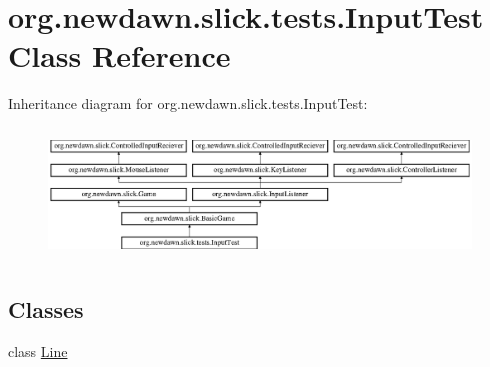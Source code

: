 \hypertarget{classorg_1_1newdawn_1_1slick_1_1tests_1_1_input_test}{}\section{org.\+newdawn.\+slick.\+tests.\+Input\+Test Class Reference}
\label{classorg_1_1newdawn_1_1slick_1_1tests_1_1_input_test}
Inheritance diagram for org.\+newdawn.\+slick.\+tests.\+Input\+Test\+:\begin{figure}[H]
\begin{center}
\leavevmode
\includegraphics[height=3.522012cm]{classorg_1_1newdawn_1_1slick_1_1tests_1_1_input_test}
\end{center}
\end{figure}
\subsection*{Classes}
\begin{DoxyCompactItemize}
\item 
class \mbox{\hyperlink{classorg_1_1newdawn_1_1slick_1_1tests_1_1_input_test_1_1_line}{Line}}
\end{DoxyCompactItemize}
